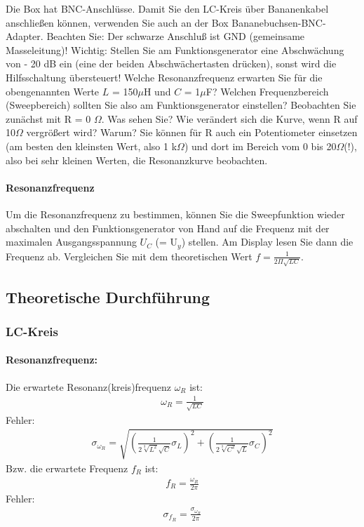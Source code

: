 \documentclass[12pt]{scrartcl}
\begin{document}

Die Box hat BNC-Anschlüsse. Damit Sie den LC-Kreis über Bananenkabel anschließen können, verwenden Sie auch an der Box Bananebuchsen-BNC-Adapter. Beachten Sie: Der schwarze Anschluß ist GND (gemeinsame
Masseleitung)! Wichtig: Stellen Sie am Funktionsgenerator eine Abschwächung von - 20 dB ein (eine der beiden Abschwächertasten drücken), sonst wird die Hilfsschaltung übersteuert! Welche Resonanzfrequenz erwarten Sie für die obengenannten Werte
$L$ = 150$\mu$H und $C$ = 1$\mu$F? Welchen Frequenzbereich (Sweepbereich) sollten Sie also am Funktionsgenerator einstellen?
Beobachten Sie zunächst mit R = 0
$\Omega$. Was sehen Sie? Wie verändert sich die Kurve, wenn R auf 10$\Omega$ vergrößert wird? Warum? Sie können für R auch ein Potentiometer einsetzen (am besten den kleinsten Wert, also 1 k$\Omega$) und dort im Bereich vom 0 bis 20$\Omega$(!), also bei sehr kleinen Werten, die Resonanzkurve beobachten.
\paragraph{Resonanzfrequenz}
Um die Resonanzfrequenz zu bestimmen, können Sie die Sweepfunktion wieder abschalten und den Funktionsgenerator von Hand auf die Frequenz mit der maximalen Ausgangsspannung
$U_C$ (= U$_y$) stellen. Am Display lesen Sie dann die Frequenz ab. Vergleichen Sie mit dem theoretischen Wert
$f = \frac{1}{2 \Pi \sqrt{LC}}$.
\subsection{Theoretische Durchführung}
\subsubsection{LC-Kreis}
\paragraph{Resonanzfrequenz:\newline}
Die erwartete Resonanz(kreis)frequenz $\omega_R$ ist:
\begin{align}
\omega_R = \frac{1}{\sqrt{LC}}
\end{align}
Fehler:
\begin{align}
\sigma_{\omega_R} = \sqrt{
\left(\frac{1}{2\sqrt[3]{L^2}\sqrt{C}}\sigma_L\right)^2+
\left(\frac{1}{2\sqrt[3]{C^2}\sqrt{L}}\sigma_C\right)^2}
\end{align}
Bzw. die erwartete Frequenz $f_R$ ist:
\begin{align}
f_R = \frac{\omega_R}{2\pi}
\end{align}
Fehler:
\begin{align}
\sigma_{f_R} = \frac{\sigma_{\omega_R}}{2 \pi}
\end{align}
\end{document}
